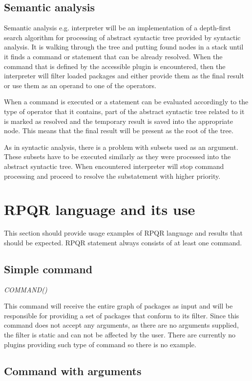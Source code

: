 \subsection*{Semantic analysis}
Semantic analysis e.g. interpreter will be an implementation of a depth-first search algorithm for processing
of abstract syntactic tree provided by syntactic analysis. It is walking through the tree and putting
found nodes in a stack until it finds a command or statement that can be already resolved. When the command
that is defined by the accessible plugin is encountered, then the interpreter will filter loaded packages and
either provide them as the final result or use them as an operand to one of the operators.

When a command is executed or a statement can be evaluated accordingly to the type of operator that it
contains, part of the abstract syntactic tree related to it is marked as resolved and the temporary result
is saved into the appropriate node. This means that the final result will be present as the root
of the tree.

As in syntactic analysis, there is a problem with subsets used as an argument. These subsets have
to be executed similarly as they were processed into the abstract syntactic tree. When encountered
interpreter will stop command processing and proceed to resolve the substatement with higher priority.

\section{RPQR language and its use}
This section should provide usage examples of RPQR language and results that should be expected.
RPQR statement always consists of at least one command.

\subsection*{Simple command}

\textit{COMMAND()}

This command will receive the entire graph of packages as input and will be responsible for providing
a set of packages that conform to its filter. Since this command does not accept any arguments, as there
are no arguments supplied, the filter is static and can not be affected by the user.
There are currently no plugins providing such type of command so there is no example.

\subsection*{Command with arguments}

